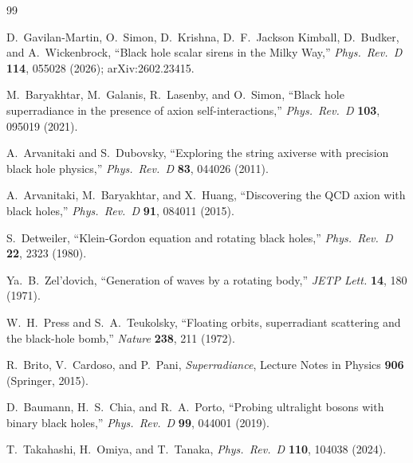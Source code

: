 \documentclass[11pt]{article}
\begin{document}
\begin{thebibliography}{99}

D.~Gavilan-Martin, O.~Simon, D.~Krishna, D.~F.~Jackson Kimball, D.~Budker, and A.~Wickenbrock,
``Black hole scalar sirens in the Milky Way,''
\emph{Phys.\ Rev.\ D} \textbf{114}, 055028 (2026); arXiv:2602.23415.

M.~Baryakhtar, M.~Galanis, R.~Lasenby, and O.~Simon,
``Black hole superradiance in the presence of axion self-interactions,''
\emph{Phys.\ Rev.\ D} \textbf{103}, 095019 (2021).

A.~Arvanitaki and S.~Dubovsky,
``Exploring the string axiverse with precision black hole physics,''
\emph{Phys.\ Rev.\ D} \textbf{83}, 044026 (2011).

A.~Arvanitaki, M.~Baryakhtar, and X.~Huang,
``Discovering the QCD axion with black holes,''
\emph{Phys.\ Rev.\ D} \textbf{91}, 084011 (2015).

S.~Detweiler,
``Klein-Gordon equation and rotating black holes,''
\emph{Phys.\ Rev.\ D} \textbf{22}, 2323 (1980).

Ya.~B.~Zel'dovich,
``Generation of waves by a rotating body,''
\emph{JETP Lett.} \textbf{14}, 180 (1971).

W.~H.~Press and S.~A.~Teukolsky,
``Floating orbits, superradiant scattering and the black-hole bomb,''
\emph{Nature} \textbf{238}, 211 (1972).

R.~Brito, V.~Cardoso, and P.~Pani,
\emph{Superradiance}, Lecture Notes in Physics \textbf{906} (Springer, 2015).

D.~Baumann, H.~S.~Chia, and R.~A.~Porto,
``Probing ultralight bosons with binary black holes,''
\emph{Phys.\ Rev.\ D} \textbf{99}, 044001 (2019).

T.~Takahashi, H.~Omiya, and T.~Tanaka,
\emph{Phys.\ Rev.\ D} \textbf{110}, 104038 (2024).

\end{thebibliography}
\end{document}
